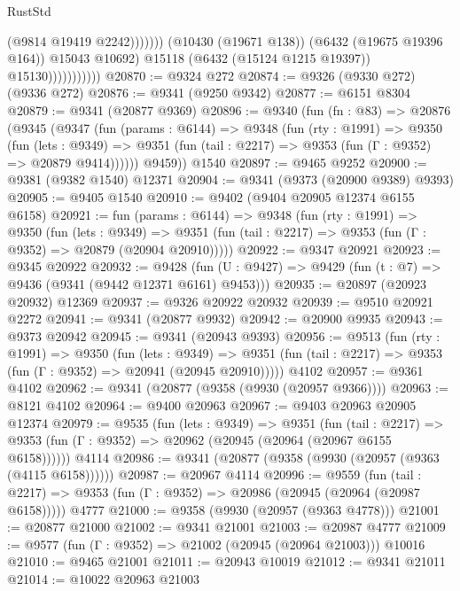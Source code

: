 \begin{lexlean}{RustStd}
\begin{coremodule}
                                        (@9814 @19419 @2242)))))))
                            (@10430 (@19671 @138))
                            (@6432 (@19675 @19396 @164))
                            @15043
                            @10692)
                          @15118
                          (@6432 (@15124 @1215 @19397))
                          @15130)))))))))))
@20870 := @9324 @272
@20874 := @9326 (@9330 @272) (@9336 @272)
@20876 := @9341 (@9250 @9342)
@20877 := @6151 @8304
@20879 := @9341 (@20877 @9369)
@20896 := @9340
    (fun (fn : @83) =>
    @20876
      (@9345
        (@9347
          (fun (params : @6144) =>
          @9348
            (fun (rty : @1991) =>
            @9350
              (fun (lets : @9349) =>
              @9351 (fun (tail : @2217) => @9353 (fun (Γ : @9352) => @20879 @9414))))))
        @9459))
    @1540
@20897 := @9465 @9252
@20900 := @9381 (@9382 @1540) @12371
@20904 := @9341 (@9373 (@20900 @9389) @9393)
@20905 := @9405 @1540
@20910 := @9402 (@9404 @20905 @12374 @6155 @6158)
@20921 := fun (params : @6144) =>
  @9348
    (fun (rty : @1991) =>
    @9350
      (fun (lets : @9349) =>
      @9351 (fun (tail : @2217) => @9353 (fun (Γ : @9352) => @20879 (@20904 @20910)))))
@20922 := @9347 @20921
@20923 := @9345 @20922
@20932 := @9428
    (fun (U : @9427) => @9429 (fun (t : @7) => @9436 (@9341 (@9442 @12371 @6161) @9453)))
@20935 := @20897 (@20923 @20932) @12369
@20937 := @9326 @20922 @20932
@20939 := @9510 @20921 @2272
@20941 := @9341 (@20877 @9932)
@20942 := @20900 @9935
@20943 := @9373 @20942
@20945 := @9341 (@20943 @9393)
@20956 := @9513
    (fun (rty : @1991) =>
    @9350
      (fun (lets : @9349) =>
      @9351 (fun (tail : @2217) => @9353 (fun (Γ : @9352) => @20941 (@20945 @20910)))))
    @4102
@20957 := @9361 @4102
@20962 := @9341 (@20877 (@9358 (@9930 (@20957 @9366))))
@20963 := @8121 @4102
@20964 := @9400 @20963
@20967 := @9403 @20963 @20905 @12374
@20979 := @9535
    (fun (lets : @9349) =>
    @9351
      (fun (tail : @2217) =>
      @9353 (fun (Γ : @9352) => @20962 (@20945 (@20964 (@20967 @6155 @6158))))))
    @4114
@20986 := @9341 (@20877 (@9358 (@9930 (@20957 (@9363 (@4115 @6158))))))
@20987 := @20967 @4114
@20996 := @9559
    (fun (tail : @2217) => @9353 (fun (Γ : @9352) => @20986 (@20945 (@20964 (@20987 @6158)))))
    @4777
@21000 := @9358 (@9930 (@20957 (@9363 @4778)))
@21001 := @20877 @21000
@21002 := @9341 @21001
@21003 := @20987 @4777
@21009 := @9577 (fun (Γ : @9352) => @21002 (@20945 (@20964 @21003))) @10016
@21010 := @9465 @21001
@21011 := @20943 @10019
@21012 := @9341 @21011
@21014 := @10022 @20963 @21003

\end{coremodule}
\end{lexlean}
